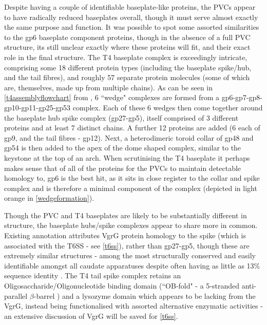 Despite having a couple of identifiable baseplate-like proteins, the PVCs appear to have radically reduced baseplates overall, though it must serve almost exactly the same purpose and function. It was possible to spot some assorted similarities to the gp6 baseplate component proteins, though in the absence of a full PVC structure, its still unclear exactly where these proteins will fit, and their exact role in the final structure. The T4 baseplate complex is exceedingly intricate, comprising some 18 different protein types (including the baseplate spike/hub, and the tail fibres), and roughly 57 separate protein molecules (some of which are, themselves, made up from multiple chains). As can be seen in \vref{t4assemblyflowchart} from \cite{Leiman2004}, 6 ``wedge" complexes are formed from a gp6-gp7-gp8-gp10-gp11-gp25-gp53 complex. Each of these 6 wedges then come together around the baseplate hub spike complex (gp27-gp5), itself comprised of 3 different proteins and at least 7 distinct chains. A further 12 proteins are added (6 each of gp9, and the tail fibres - gp12). Next, a heterodimeric toroid collar of gp48 and gp54 is then added to the apex of the dome shaped complex, similar to the keystone at the top of an arch. When scrutinising the T4 baseplate it perhaps makes sense that of all of the proteins for the PVCs to maintain detectable homology to, gp6 is the best hit, as it sits in close register to the collar and spike complex and is therefore a minimal component of the complex (depicted in light orange in \vref{wedgeformation}).

Though the PVC and T4 baseplates are likely to be substantially different in structure, the baseplate hubs/spike complexes appear to share more in common. Existing annotation attributes VgrG protein homology to the spike (which is associated with the T6SS - see \vref{t6ss}), rather than gp27-gp5, though these are extremely similar structures - among the most structurally conserved and easily identifiable amongst all caudate apparatuses despite often having as little as 13\% sequence identity \citep{Veesler2011, Leiman2009, Basler2015}. The T4 tail spike complex retains an Oligosaccharide/Oligonucleotide binding domain (``OB-fold" - a 5-stranded anti-parallel $\beta$-barrel \citep{Murzin1993}) and a lysozyme domain which appears to be lacking from the VgrG, instead being functionalised with assorted alternative enzymatic activities \citep{Pukatzki2007, Kanamaru2002} - an extensive discussion of VgrG will be saved for \vref{t6ss}.

